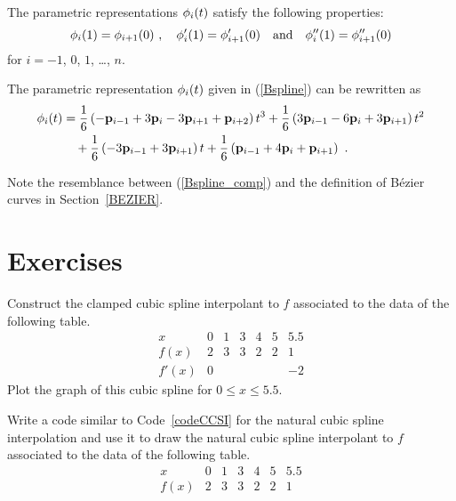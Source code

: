 The parametric representations $\mathbf{\phi}_i(t)$ satisfy the following
properties:
\[
\mathbf{\phi}_i(1) = \mathbf{\phi}_{i+1}(0) \ ,\quad
\mathbf{\phi}'_i(1) = \mathbf{\phi}'_{i+1}(0) \quad
\text{and} \quad
\mathbf{\phi}''_i(1) = \mathbf{\phi}''_{i+1}(0)
\]
for $i=-1$, $0$, $1$, \ldots, $n$.

The parametric representation $\mathbf{\phi}_i(t)$ given in (\ref{Bspline})
can be rewritten as
\begin{align}
\VEC{\phi}_i(t) &= \frac{1}{6} \left(-\VEC{p}_{i-1} + 3 \VEC{p}_i
- 3 \VEC{p}_{i+1} + \VEC{p}_{i+2} \right) t^3
+ \frac{1}{6} \left(3 \VEC{p}_{i-1} - 6 \VEC{p}_i
+ 3 \VEC{p}_{i+1} \right) t^2
\nonumber \\
&\quad + \frac{1}{6} \left(-3 \VEC{p}_{i-1} + 3 \VEC{p}_{i+1} \right) t
+ \frac{1}{6} \left(\VEC{p}_{i-1} + 4 \VEC{p}_i + \VEC{p}_{i+1} \right)\ .
\label{Bspline_comp}
\end{align}

Note the resemblance between (\ref{Bspline_comp}) and the definition
of Bézier curves in Section~\ref{BEZIER}.

\section{Exercises}

\begin{question}
Construct the clamped cubic spline interpolant to $f$ associated to
the data of the following table.
\[
\begin{array}{c|cccccc}
x & 0 & 1 & 3 & 4 & 5 & 5.5 \\
\hline
f(x) & 2 & 3 & 3 & 2 & 2 & 1 \\
f'(x) & 0 & & & & & -2 
\end{array}
\]
Plot the graph of this cubic spline for $0 \leq x \leq 5.5$.
\label{intBQ1}
\end{question}

\begin{question}
Write a code similar to Code~\ref{codeCCSI} for the natural cubic spline
interpolation and use it to draw the natural cubic spline interpolant
to $f$ associated to the data of the following table.
\[
\begin{array}{c|cccccc}
x & 0 & 1 & 3 & 4 & 5 & 5.5 \\
\hline
f(x) & 2 & 3 & 3 & 2 & 2 & 1
\end{array}
\]
\label{intBQ2}
\end{question}

